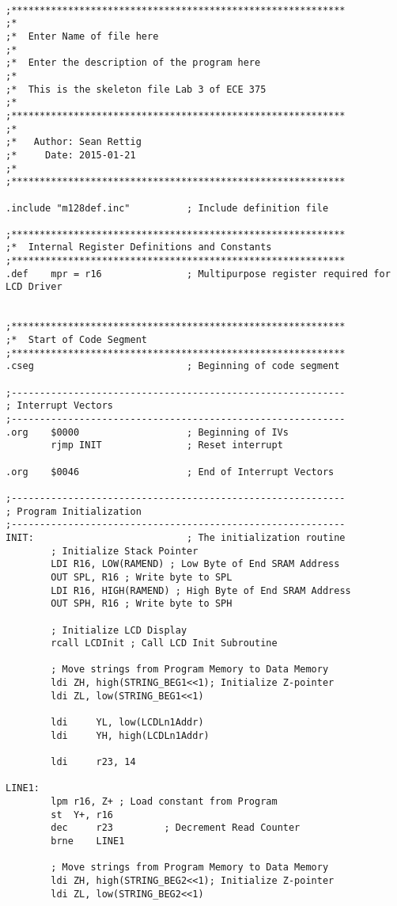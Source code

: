 \documentclass[12pt,letterpaper]{article}
\begin{document}
\begin{verbatim}

;***********************************************************
;*
;*	Enter Name of file here
;*
;*	Enter the description of the program here
;*
;*	This is the skeleton file Lab 3 of ECE 375
;*
;***********************************************************
;*
;*	 Author: Sean Rettig
;*	   Date: 2015-01-21
;*
;***********************************************************

.include "m128def.inc"			; Include definition file

;***********************************************************
;*	Internal Register Definitions and Constants
;***********************************************************
.def	mpr = r16				; Multipurpose register required for LCD Driver


;***********************************************************
;*	Start of Code Segment
;***********************************************************
.cseg							; Beginning of code segment

;-----------------------------------------------------------
; Interrupt Vectors
;-----------------------------------------------------------
.org	$0000					; Beginning of IVs
		rjmp INIT				; Reset interrupt

.org	$0046					; End of Interrupt Vectors

;-----------------------------------------------------------
; Program Initialization
;-----------------------------------------------------------
INIT:							; The initialization routine
		; Initialize Stack Pointer
		LDI R16, LOW(RAMEND) ; Low Byte of End SRAM Address
		OUT SPL, R16 ; Write byte to SPL
		LDI R16, HIGH(RAMEND) ; High Byte of End SRAM Address
		OUT SPH, R16 ; Write byte to SPH

		; Initialize LCD Display
		rcall LCDInit ; Call LCD Init Subroutine

		; Move strings from Program Memory to Data Memory
		ldi ZH, high(STRING_BEG1<<1); Initialize Z-pointer
		ldi ZL, low(STRING_BEG1<<1)

		ldi		YL, low(LCDLn1Addr)
		ldi		YH, high(LCDLn1Addr)

		ldi		r23, 14

LINE1:
		lpm r16, Z+ ; Load constant from Program
		st  Y+, r16
		dec		r23			; Decrement Read Counter
		brne	LINE1
		
		; Move strings from Program Memory to Data Memory
		ldi ZH, high(STRING_BEG2<<1); Initialize Z-pointer
		ldi ZL, low(STRING_BEG2<<1)


\end{verbatim}
\end{document}
